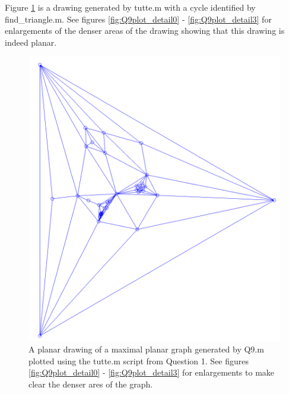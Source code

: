 \documentclass[a4paper]{article}
\begin{document}
\bigskip
Figure \ref{fig:Q9plot_full} is a drawing generated by tutte.m with a cycle identified by find\_triangle.m. See figures \ref{fig:Q9plot_detail0} - \ref{fig:Q9plot_detail3} for enlargements of the denser areas of the drawing showing that this drawing is indeed planar.

\begin{figure}[H]
    \centering
    \includegraphics[width=0.98\columnwidth]{Q9_full_crop.png}
    \caption{A planar drawing of a maximal planar graph generated by Q9.m plotted using the tutte.m script from Question 1. See figures \ref{fig:Q9plot_detail0} - \ref{fig:Q9plot_detail3} for enlargements to make clear the denser ares of the graph.}
    \label{fig:Q9plot_full}
\end{figure}
\end{document}

